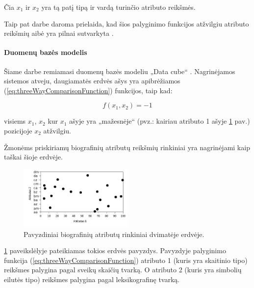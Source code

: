 Čia $x_1$ ir $x_2$ yra tą patį tipą ir vardą turinčio atributo reikšmės.

Taip pat darbe daroma prielaida, kad šios palyginimo funkcijos atžvilgiu atributo reikšmių aibė yra pilnai sutvarkyta \cite{hrbacek1999introduction}.






\paragraph{Duomenų bazės modelis}

Šiame darbe remiamasi duomenų bazės modeliu „Data cube“ \cite{marcel2000modeling}.
Nagrinėjamos sistemos atveju, daugiamatės erdvės ašys yra apibrėžiamos (\ref{eq:threeWayComparisonFunction}) funkcijos, taip kad:

\begin{equation}
	f(x_1, x_2)=-1
\label{eq:increasingOrderOfAtributes}
\end{equation}

visiems $x_1$, $x_2$ kur $x_1$ ašyje yra „mažesnėje“ (pvz.: kairiau atributo 1 ašyje \ref{img:multidimensionalGallery} pav.) pozicijoje $x_2$ atžvilgiu.

Žmonėms priskiriamų biografinių atributų reikšmių rinkiniai yra nagrinėjami kaip taškai šioje erdvėje.

\begin{figure}[H]
\begin{center}
\includegraphics[width=0.5\textwidth]{img/MultidimensionalGallery.png}
\caption{Pavyzdiniai biografinių atributų rinkiniai dvimatėje erdvėje.}
\label{img:multidimensionalGallery}
\end{center}
\end{figure}

\ref{img:multidimensionalGallery} paveikslėlyje pateikiamas tokios erdvės pavyzdys.
Pavyzdyje palyginimo funkcija (\ref{eq:threeWayComparisonFunction}) atributo 1 (kuris yra skaitinio tipo) reikšmes palygina pagal sveikų skaičių tvarką.
O atributo 2 (kuris yra simbolių eilutės tipo) reikšmes palygina pagal leksikografinę tvarką.





